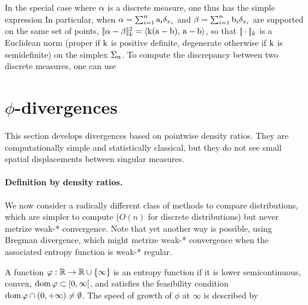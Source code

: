 In the special case where $\alpha$ is a discrete measure, one thus has the simple expression
In particular, when $\alpha=\sum_{i=1}^n \mathrm{a}_i \delta_{x_i}$ and $\beta=\sum_{i=1}^n \mathrm{b}_i \delta_{x_i}$ are supported on the same set of points, $|\!| \alpha-\beta |\!|_{k}^2 = \langle \mathrm{k}(\mathrm{a}-\mathrm{b}),\,\mathrm{a}-\mathrm{b}\rangle$, so that $|\!| \cdot |\!|_{k}$ is a Euclidean norm (proper if $\mathrm{k}$ is positive definite, degenerate otherwise if $\mathrm{k}$ is semidefinite) on the simplex $\Sigma_n$.
%
To compute the discrepancy between two discrete measures, one can use

\section[phi-divergences]{$\phi$-divergences}
\label{sec-phi-div}


This section develops divergences based on pointwise density ratios. They are computationally simple and statistically classical, but they do not see small spatial displacements between singular measures.

\paragraph{Definition by density ratios.}

We now consider a radically different class of methods to compare distributions, which are simpler to compute ($O(n)$ for discrete distributions) but never metrize weak-* convergence.
%
Note that yet another way is possible, using Bregman divergence, which might metrize weak-* convergence when the associated entropy function is weak-* regular.

\begin{defn}
\label{def_entropy}
A function $\varphi : \mathbb{R} \to \mathbb{R} \cup \{\infty\}$ is an entropy function if it is lower semicontinuous, convex, $\operatorname{dom} \varphi\subset [0,\infty[$, and satisfies the feasibility condition $\operatorname{dom} \varphi \cap (0,+\infty) \neq \emptyset$. The speed of growth of $\phi$ at $\infty$ is described by %
\end{defn}

